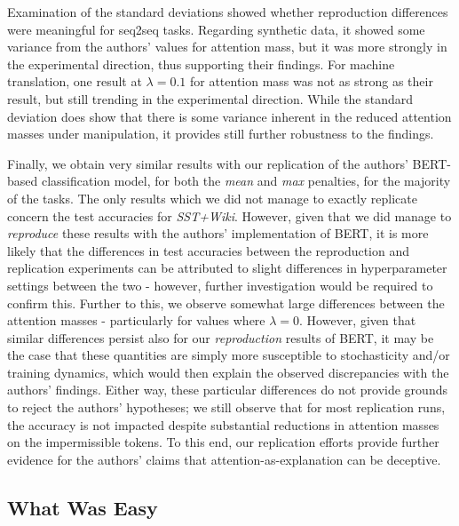 Examination of the standard deviations showed whether reproduction differences were meaningful for seq2seq tasks. Regarding synthetic data, it showed some variance from the authors' values for attention mass, but it was more strongly in the experimental direction, thus supporting their findings. For machine translation, one result at $\lambda = 0.1$ for attention mass was not as strong as their result, but still trending in the experimental direction. While the standard deviation does show that there is some variance inherent in the reduced attention masses under manipulation, it provides still further robustness to the findings.

Finally, we obtain very similar results with our replication of the authors' BERT-based classification model, for both the \textit{mean} and \textit{max} penalties, for the majority of the tasks. The only results which we did not manage to exactly replicate concern the test accuracies for \textit{SST+Wiki}. However, given that we did manage to \textit{reproduce} these results with the authors' implementation of BERT, it is more likely that the differences in test accuracies between the reproduction and replication experiments can be attributed to slight differences in hyperparameter settings between the two - however, further investigation would be required to confirm this. Further to this, we observe somewhat large differences between the attention masses - particularly for values where $\lambda = 0$. However, given that similar differences persist also for our \textit{reproduction} results of BERT, it may be the case that these quantities are simply more susceptible to stochasticity and/or training dynamics, which would then explain the observed discrepancies with the authors' findings. Either way, these particular differences do not provide grounds to reject the authors' hypotheses; we still observe that for most replication runs, the accuracy is not impacted despite substantial reductions in attention masses on the impermissible tokens. To this end, our replication efforts provide further evidence for the authors' claims that attention-as-explanation can be deceptive.

\subsection{What Was Easy}

